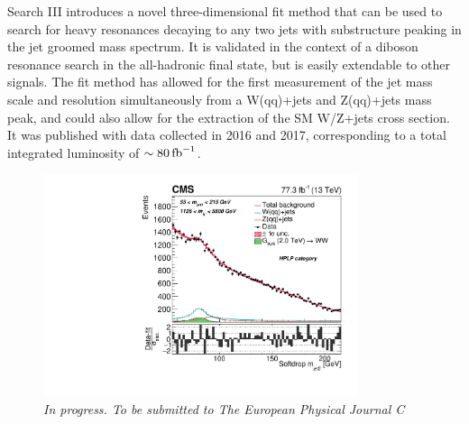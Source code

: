 \begin{centering}
{\newline
Search III introduces a novel three-dimensional fit method that can be used to search for heavy resonances decaying to any two jets with substructure peaking in the jet groomed mass spectrum. It is validated in the context of a diboson resonance search in the all-hadronic final state, but is easily extendable to other signals. The fit method has allowed for the first measurement of the jet mass scale and resolution simultaneously from a W(qq)+jets and Z(qq)+jets mass peak, and could also allow for the extraction of the SM W/Z+jets cross section. It was published with data collected in 2016 and 2017, corresponding to a total integrated luminosity of $\sim 80 \mbox{\ensuremath{\,\text{fb}^\text{$-$1}}}$.}
\end{centering}
 
\begin{figure}[h!]
    \centering
    \vspace*{10mm}
    \includegraphics[height=6.5cm]{figures/analysis/search3/B2G-18-002/PostFitComboHPLP_Y-Proj__x___0_-1_z___0_-1.pdf}
    \vspace*{10mm}
    \caption*{\footnotesize{\textit{In progress. To be submitted to The European Physical Journal C}}}
\end{figure}

\clearpage




